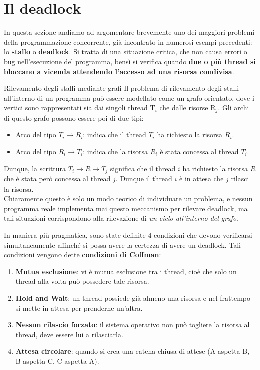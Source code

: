 \documentclass[12pt]{report}
\begin{document}
	\section{Il deadlock}
	In questa sezione andiamo ad argomentare brevemente uno dei maggiori problemi della programmazione concorrente, già incontrato in numerosi esempi precedenti: lo \textbf{stallo} o \textbf{deadlock}. Si tratta di una situazione critica, che non causa errori o bug nell'esecuzione del programma, bensì si verifica quando \textbf{due o più thread si bloccano a vicenda attendendo l'accesso ad una risorsa condivisa}.
	\begin{osservazione}{Rilevamento degli stalli mediante grafi}{}
		Il problema di rilevamento degli stalli all'interno di un programma può essere modellato come un grafo orientato, dove i vertici sono rappresentati sia dai singoli thread T$_i$ che dalle risorse R$_j$. Gli archi di questo grafo possono essere poi di due tipi:
		\begin{itemize}
			\item Arco del tipo $T_i \rightarrow R_i$: indica che il thread $T_i$ ha richiesto la risorsa $R_i$.
			
			\item Arco del tipo $R_i \rightarrow T_i$: indica che la risorsa $R_i$ è stata concessa al thread $T_i$.
		\end{itemize}
		Dunque, la scrittura $T_i \rightarrow R \rightarrow T_j$ significa che il thread $i$ ha richiesto la risorsa $R$ che è stata però concessa al thread $j$. Dunque il thread $i$ è in attesa che $j$ rilasci la risorsa.\\
		Chiaramente questo è solo un modo teorico di individuare un problema, e nessun programma reale implementa mai questo meccanismo per rilevare deadlock, ma tali situazioni corrispondono alla rilevazione di \textit{un ciclo all'interno del grafo}.
	\end{osservazione}
	
	In maniera più pragmatica, sono state definite 4 condizioni che devono verificarsi simultaneamente affinché si possa avere la certezza di avere un deadlock. Tali condizioni vengono dette \textbf{condizioni di Coffman}:
	\begin{enumerate}
		\item \textbf{Mutua esclusione}: vi è mutua esclusione tra i thread, cioè che solo un thread alla volta può possedere tale risorsa.
		
		\item \textbf{Hold and Wait}: un thread possiede già almeno una risorsa e nel frattempo si mette in attesa per prenderne un'altra.
		
		\item \textbf{Nessun rilascio forzato}: il sistema operativo non può togliere la risorsa al thread, deve essere lui a rilasciarla.
		
		\item \textbf{Attesa circolare}: quando si crea una catena chiusa di attese (A aspetta B, B aspetta C, C aspetta A).
	\end{enumerate}
	
\end{document}
